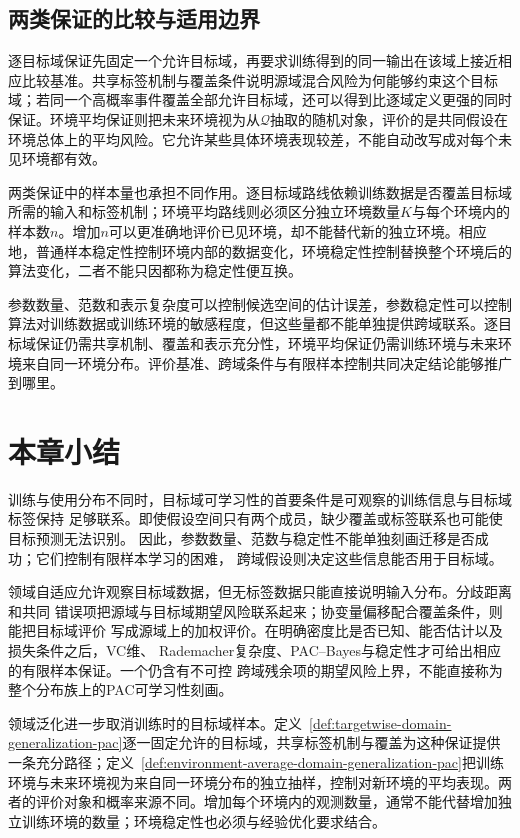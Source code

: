 \subsection{两类保证的比较与适用边界}
\label{sec:dg-guarantee-comparison}

逐目标域保证先固定一个允许目标域，再要求训练得到的同一输出在该域上接近相应比较基准。共享标签机制与覆盖条件说明源域混合风险为何能够约束这个目标域；若同一个高概率事件覆盖全部允许目标域，还可以得到比逐域定义更强的同时保证。环境平均保证则把未来环境视为从$\mathcal Q$抽取的随机对象，评价的是共同假设在环境总体上的平均风险。它允许某些具体环境表现较差，不能自动改写成对每个未见环境都有效。

两类保证中的样本量也承担不同作用。逐目标域路线依赖训练数据是否覆盖目标域所需的输入和标签机制；环境平均路线则必须区分独立环境数量$K$与每个环境内的样本数$n$。增加$n$可以更准确地评价已见环境，却不能替代新的独立环境。相应地，普通样本稳定性控制环境内部的数据变化，环境稳定性控制替换整个环境后的算法变化，二者不能只因都称为稳定性便互换。

参数数量、范数和表示复杂度可以控制候选空间的估计误差，参数稳定性可以控制算法对训练数据或训练环境的敏感程度，但这些量都不能单独提供跨域联系。逐目标域保证仍需共享机制、覆盖和表示充分性，环境平均保证仍需训练环境与未来环境来自同一环境分布。评价基准、跨域条件与有限样本控制共同决定结论能够推广到哪里。

\section{本章小结}
\label{sec:transfer-learning-summary}

训练与使用分布不同时，目标域可学习性的首要条件是可观察的训练信息与目标域标签保持
足够联系。即使假设空间只有两个成员，缺少覆盖或标签联系也可能使目标预测无法识别。
因此，参数数量、范数与稳定性不能单独刻画迁移是否成功；它们控制有限样本学习的困难，
跨域假设则决定这些信息能否用于目标域。

领域自适应允许观察目标域数据，但无标签数据只能直接说明输入分布。分歧距离和共同
错误项把源域与目标域期望风险联系起来；协变量偏移配合覆盖条件，则能把目标域评价
写成源域上的加权评价。在明确密度比是否已知、能否估计以及损失条件之后，VC维、
Rademacher复杂度、PAC--Bayes与稳定性才可给出相应的有限样本保证。一个仍含有不可控
跨域残余项的期望风险上界，不能直接称为整个分布族上的PAC可学习性刻画。

领域泛化进一步取消训练时的目标域样本。定义~\ref{def:targetwise-domain-generalization-pac}逐一固定允许的目标域，共享标签机制与覆盖为这种保证提供一条充分路径；定义~\ref{def:environment-average-domain-generalization-pac}把训练环境与未来环境视为来自同一环境分布的独立抽样，控制对新环境的平均表现。两者的评价对象和概率来源不同。增加每个环境内的观测数量，通常不能代替增加独立训练环境的数量；环境稳定性也必须与经验优化要求结合。

